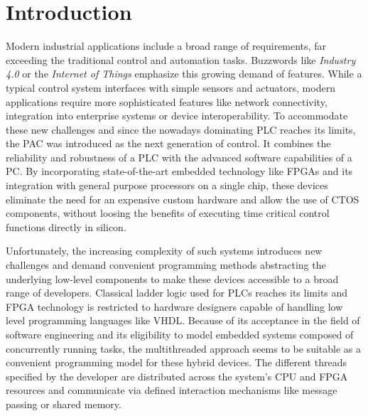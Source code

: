 \chapter{Introduction}

Modern industrial applications include a broad range of requirements, far
exceeding the traditional control and automation tasks. Buzzwords like
\emph{Industry 4.0} or the \emph{Internet of Things} emphasize this growing
demand of features. While a typical control system interfaces with simple
sensors and actuators, modern applications require more sophisticated features
like network connectivity, integration into enterprise systems or device
interoperability. To accommodate these new challenges and since the nowadays
dominating \ac{PLC} reaches its limits, the \ac{PAC} was introduced as the
next generation of control. It combines the reliability and robustness of a
\ac{PLC} with the advanced software capabilities of a PC. By incorporating
state-of-the-art embedded technology like \acp{FPGA} and its integration with
general purpose processors on a single chip, these devices eliminate the need
for an expensive custom hardware and allow  the use of \ac{CTOS} components,
without loosing the benefits of executing time critical control functions
directly in silicon.

Unfortunately, the increasing complexity of such systems introduces new
challenges and demand convenient programming methods abstracting the
underlying low-level components to make these devices accessible to a broad
range of developers. Classical ladder logic used for \acp{PLC} reaches its
limits and \ac{FPGA} technology is restricted to hardware designers capable of
handling low level programming languages like VHDL. Because of its acceptance
in the field of software engineering and its eligibility to model embedded
systems composed of concurrently running tasks, the multithreaded approach
seems to be suitable as a convenient programming model for these hybrid
devices. The different threads specified by the developer are distributed
across the system's \acs{CPU} and \ac{FPGA} resources and communicate via
defined interaction mechanisms like message passing or shared memory.


